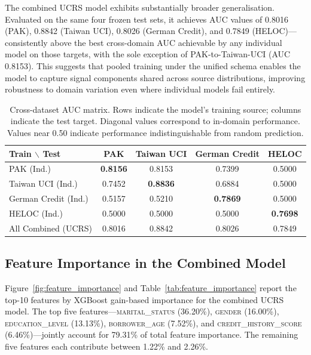 \documentclass[onecolumn]{IEEEtai}
\begin{document}
The combined UCRS model exhibits substantially broader generalisation. Evaluated on the same four frozen test sets, it achieves AUC values of 0.8016 (PAK), 0.8842 (Taiwan UCI), 0.8026 (German Credit), and 0.7849 (HELOC)---consistently above the best cross-domain AUC achievable by any individual model on those targets, with the sole exception of PAK-to-Taiwan-UCI (AUC 0.8153). This suggests that pooled training under the unified schema enables the model to capture signal components shared across source distributions, improving robustness to domain variation even where individual models fail entirely.

\begin{table}[!htbp]
\centering
\caption{Cross-dataset AUC matrix. Rows indicate the model's training source; columns indicate the test target. Diagonal values correspond to in-domain performance. Values near 0.50 indicate performance indistinguishable from random prediction.}
\label{tab:cross_eval_auc}
\setlength{\tabcolsep}{5pt}
\begin{tabular}{lcccc}
\toprule
\textbf{Train $\backslash$ Test} & \textbf{PAK} & \textbf{Taiwan UCI} & \textbf{German Credit} & \textbf{HELOC} \\
\midrule
PAK (Ind.)           & \textbf{0.8156} & 0.8153          & 0.7399          & 0.5000 \\
Taiwan UCI (Ind.)    & 0.7452          & \textbf{0.8836} & 0.6884          & 0.5000 \\
German Credit (Ind.) & 0.5157          & 0.5210          & \textbf{0.7869} & 0.5000 \\
HELOC (Ind.)         & 0.5000          & 0.5000          & 0.5000          & \textbf{0.7698} \\
\midrule
All Combined (UCRS)  & 0.8016          & 0.8842          & 0.8026          & 0.7849 \\
\bottomrule
\end{tabular}
\end{table}


\subsection{Feature Importance in the Combined Model}\vspace{-2pt}

Figure~\ref{fig:feature_importance} and Table~\ref{tab:feature_importance} report the top-10 features by XGBoost gain-based importance for the combined UCRS model. The top five features---\textsc{marital\_status} (36.20\%), \textsc{gender} (16.00\%), \textsc{education\_level} (13.13\%), \textsc{borrower\_age} (7.52\%), and \textsc{credit\_history\_score} (6.46\%)---jointly account for 79.31\% of total feature importance. The remaining five features each contribute between 1.22\% and 2.26\%.
\end{document}
